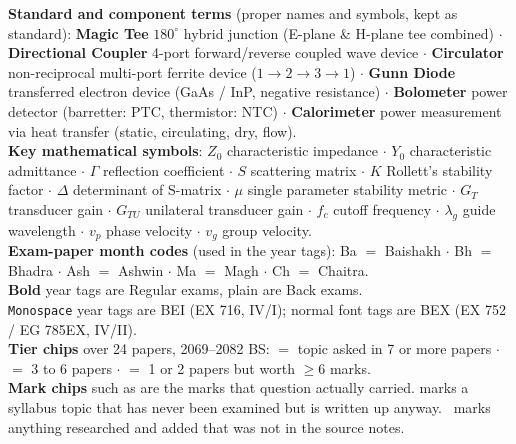 \vspace{4pt}
{\color{sub}\footnotesize
\textbf{Standard and component terms} (proper names and symbols, kept as standard):
\textbf{Magic Tee} $180^\circ$ hybrid junction (E-plane \& H-plane tee combined) $\cdot$
\textbf{Directional Coupler} 4-port forward/reverse coupled wave device $\cdot$
\textbf{Circulator} non-reciprocal multi-port ferrite device ($1 \rightarrow 2 \rightarrow 3 \rightarrow 1$) $\cdot$
\textbf{Gunn Diode} transferred electron device (GaAs / InP, negative resistance) $\cdot$
\textbf{Bolometer} power detector (barretter: PTC, thermistor: NTC) $\cdot$
\textbf{Calorimeter} power measurement via heat transfer (static, circulating, dry, flow). \\
\textbf{Key mathematical symbols}:
$Z_0$ characteristic impedance $\cdot$ $Y_0$ characteristic admittance $\cdot$
$\Gamma$ reflection coefficient $\cdot$ $S$ scattering matrix $\cdot$
$K$ Rollett's stability factor $\cdot$ $\Delta$ determinant of S-matrix $\cdot$
$\mu$ single parameter stability metric $\cdot$
$G_T$ transducer gain $\cdot$ $G_{TU}$ unilateral transducer gain $\cdot$
$f_c$ cutoff frequency $\cdot$ $\lambda_g$ guide wavelength $\cdot$
$v_p$ phase velocity $\cdot$ $v_g$ group velocity. \\
\textbf{Exam-paper month codes} (used in the year tags):
Ba $=$ Baishakh $\cdot$ Bh $=$ Bhadra $\cdot$ Ash $=$ Ashwin $\cdot$
Ma $=$ Magh $\cdot$ Ch $=$ Chaitra. \\
\textbf{Bold} year tags are Regular exams, plain are Back exams. \\
\texttt{Monospace} year tags are BEI (EX 716, IV/I); normal font tags are BEX (EX 752 / EG 785EX, IV/II). \\
\textbf{Tier chips} over 24 papers, 2069--2082 BS:
\tS{} $=$ topic asked in 7 or more papers $\cdot$
\tF{} $=$ 3 to 6 papers $\cdot$
\tP{} $=$ 1 or 2 papers but worth $\ge$6 marks. \\
\textbf{Mark chips} such as  are the marks that question actually carried.
 marks a syllabus topic that has never been examined but is
written up anyway. \added\ marks anything researched and added that was not in the source notes.}
